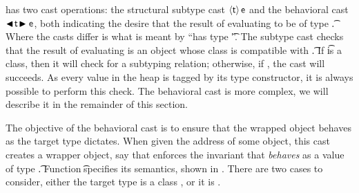 \documentclass[USenglish]{tex/lipics-v2016}
\begin{document}
\kafka has two cast operations: the structural subtype cast $\SubCast\t\e$ and the
behavioral cast $\BehCast\t\e$, both indicating the desire that the result
of evaluating \e to be of type \t.  Where the casts differ is what is meant by
``has type \t''.  The subtype cast checks that the result of evaluating \e
is an object whose class is compatible with \t. If \t is a class, then it
will check for a subtyping relation; otherwise, if \EM{\t=\any}, the cast 
will succeeds. As every value in the heap is
tagged by its type constructor, it is always possible to perform this check. 
The behavioral cast is more complex, we will
describe it in the remainder of this section.

The objective of the behavioral cast is to ensure that the wrapped object
behaves as the target type dictates. When given the address \a of some
object, this cast creates a wrapper object, say \ap that enforces the 
invariant that \a \emph{behaves} as a
value of type \t.  Function \behcastE\a\t\s\K \Kp\ap\sp specifies its
semantics, shown in .  There are two cases to consider,
either the target type is a class \Cp, or it is \any.
\end{document}
